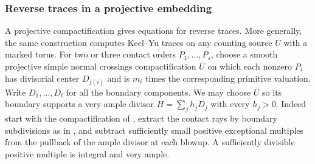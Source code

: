 \documentclass[11pt,reqno]{amsart}
\numberwithin{equation}{section}
\theoremstyle{definition}
\theoremstyle{remark}
\begin{document}
\subsubsection{Reverse traces in a projective embedding}

A projective compactification gives equations for reverse traces.
More generally, the same construction computes Keel--Yu traces on any
counting source \(U\) with a marked torus. For two or three contact orders
\(P_1,\ldots,P_s\), choose a smooth projective simple normal crossings
compactification \(\overline U\) on which each nonzero \(P_i\) has divisorial
center \(D_{j(i)}\) and is \(m_i\) times the corresponding primitive
valuation. Write \(D_1,\ldots,D_t\) for all the boundary components.
We may choose \(\overline U\) so its boundary supports a very ample divisor
\(H=\sum_j h_jD_j\) with every \(h_j>0\). Indeed start with the
compactification of \cite[Lemma~19.2]{KY}, extract the contact rays by
boundary subdivisions as in \cite[Definition~1.1]{KY}, and subtract
sufficiently small positive exceptional multiples from the pullback of
the ample divisor at each blowup. A sufficiently divisible positive
multiple is integral and very ample.
\end{document}
